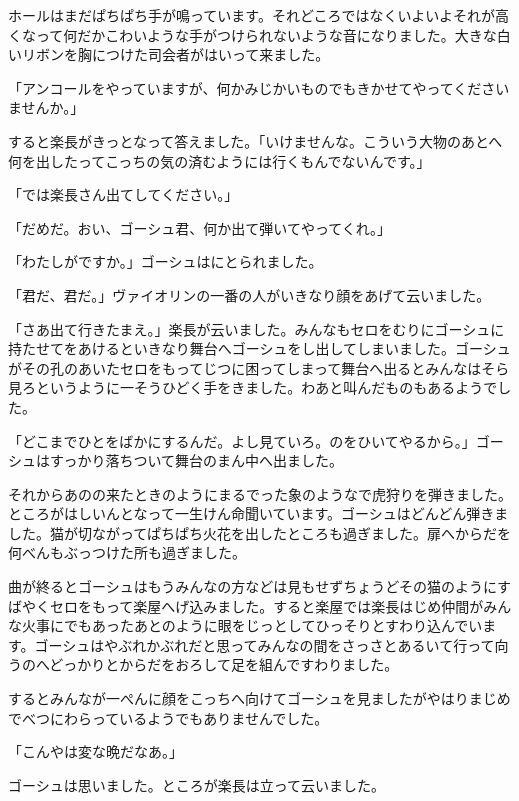 \documentclass[uplatex,a5paper,twoside]{jsarticle}
\begin{document}
ホールはまだぱちぱち手が鳴っています。それどころではなくいよいよそれが高くなって何だかこわいような手がつけられないような音になりました。大きな白いリボンを胸につけた司会者がはいって来ました。

「アンコールをやっていますが、何かみじかいものでもきかせてやってくださいませんか。」

すると楽長がきっとなって答えました。「いけませんな。こういう大物のあとへ何を出したってこっちの気の済むようには行くもんでないんです。」

「では楽長さん出てしてください。」

「だめだ。おい、ゴーシュ君、何か出て弾いてやってくれ。」

「わたしがですか。」ゴーシュはにとられました。

「君だ、君だ。」ヴァイオリンの一番の人がいきなり顔をあげて云いました。

「さあ出て行きたまえ。」楽長が云いました。みんなもセロをむりにゴーシュに持たせてをあけるといきなり舞台へゴーシュをし出してしまいました。ゴーシュがその孔のあいたセロをもってじつに困ってしまって舞台へ出るとみんなはそら見ろというように一そうひどく手をきました。わあと叫んだものもあるようでした。

「どこまでひとをばかにするんだ。よし見ていろ。のをひいてやるから。」ゴーシュはすっかり落ちついて舞台のまん中へ出ました。

それからあのの来たときのようにまるでった象のようなで虎狩りを弾きました。ところがはしいんとなって一生けん命聞いています。ゴーシュはどんどん弾きました。猫が切ながってぱちぱち火花を出したところも過ぎました。扉へからだを何べんもぶっつけた所も過ぎました。

曲が終るとゴーシュはもうみんなの方などは見もせずちょうどその猫のようにすばやくセロをもって楽屋へげ込みました。すると楽屋では楽長はじめ仲間がみんな火事にでもあったあとのように眼をじっとしてひっそりとすわり込んでいます。ゴーシュはやぶれかぶれだと思ってみんなの間をさっさとあるいて行って向うのへどっかりとからだをおろして足を組んですわりました。

するとみんなが一ぺんに顔をこっちへ向けてゴーシュを見ましたがやはりまじめでべつにわらっているようでもありませんでした。

「こんやは変な晩だなあ。」

ゴーシュは思いました。ところが楽長は立って云いました。
\end{document}
